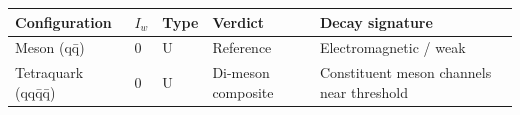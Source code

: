 \begin{longtable}[]{@{}lllll@{}}
\toprule
\begin{minipage}[b]{0.17\columnwidth}\raggedright
Configuration\strut
\end{minipage} & \begin{minipage}[b]{0.17\columnwidth}\raggedright
\(I_w\)\strut
\end{minipage} & \begin{minipage}[b]{0.17\columnwidth}\raggedright
Type\strut
\end{minipage} & \begin{minipage}[b]{0.17\columnwidth}\raggedright
Verdict\strut
\end{minipage} & \begin{minipage}[b]{0.17\columnwidth}\raggedright
Decay signature\strut
\end{minipage}\tabularnewline
\midrule
\endhead
\begin{minipage}[t]{0.17\columnwidth}\raggedright
Meson (qq̄)\strut
\end{minipage} & \begin{minipage}[t]{0.17\columnwidth}\raggedright
0\strut
\end{minipage} & \begin{minipage}[t]{0.17\columnwidth}\raggedright
U\strut
\end{minipage} & \begin{minipage}[t]{0.17\columnwidth}\raggedright
Reference\strut
\end{minipage} & \begin{minipage}[t]{0.17\columnwidth}\raggedright
Electromagnetic / weak\strut
\end{minipage}\tabularnewline
\begin{minipage}[t]{0.17\columnwidth}\raggedright
Tetraquark (qqq̄q̄)\strut
\end{minipage} & \begin{minipage}[t]{0.17\columnwidth}\raggedright
0\strut
\end{minipage} & \begin{minipage}[t]{0.17\columnwidth}\raggedright
U\strut
\end{minipage} & \begin{minipage}[t]{0.17\columnwidth}\raggedright
Di-meson composite\strut
\end{minipage} & \begin{minipage}[t]{0.17\columnwidth}\raggedright
Constituent meson channels near threshold\strut
\end{minipage}\tabularnewline

\end{longtable}

